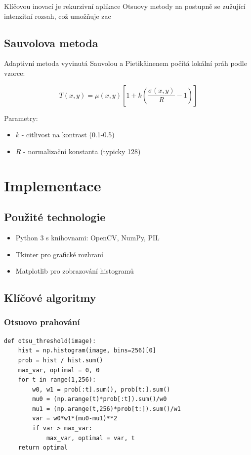 \documentclass[12pt,a4paper]{article}
\begin{document}
Klíčovou inovací je rekurzivní aplikace Otsuovy metody na postupně se zužující intenzitní rozsah, což umožňuje zac

\subsection{Sauvolova metoda}
Adaptivní metoda vyvinutá Sauvolou a Pietikäinenem počítá lokální práh podle vzorce:

\begin{equation}
T(x,y) = \mu(x,y) \left[ 1 + k \left( \frac{\sigma(x,y)}{R} - 1 \right) \right]
\end{equation}

Parametry:
\begin{itemize}
\item $k$ - citlivost na kontrast (0.1-0.5)
\item $R$ - normalizační konstanta (typicky 128)
\end{itemize}

\section{Implementace}

\subsection{Použité technologie}
\begin{itemize}
\item Python 3 s knihovnami: OpenCV, NumPy, PIL
\item Tkinter pro grafické rozhraní
\item Matplotlib pro zobrazování histogramů
\end{itemize}

\subsection{Klíčové algoritmy}

\subsubsection{Otsuovo prahování}
\begin{lstlisting}
def otsu_threshold(image):
    hist = np.histogram(image, bins=256)[0]
    prob = hist / hist.sum()
    max_var, optimal = 0, 0
    for t in range(1,256):
        w0, w1 = prob[:t].sum(), prob[t:].sum()
        mu0 = (np.arange(t)*prob[:t]).sum()/w0
        mu1 = (np.arange(t,256)*prob[t:]).sum()/w1
        var = w0*w1*(mu0-mu1)**2
        if var > max_var:
            max_var, optimal = var, t
    return optimal
\end{lstlisting}
\end{document}
